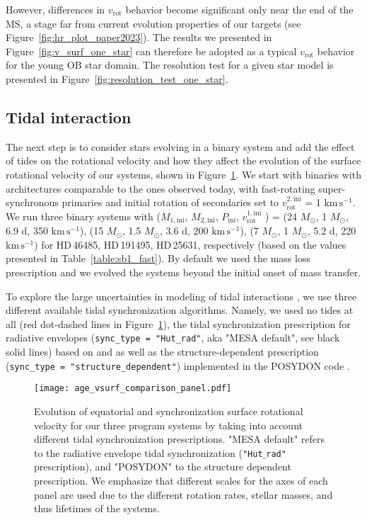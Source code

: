 \documentclass{aa}
\newcommand{\kms}{$\mathrm{km\,s^{-1}}$}
\DeclareRobustCommand{\Figref}[1]{Figure~\ref{#1}}
\DeclareRobustCommand{\Tabref}[1]{Table~\ref{#1}}
\begin{document}
However, differences in $v_\mathrm{rot}$
behavior become significant only near the end of the MS, a stage far from
current evolution properties of our targets (see \Figref{fig:hr_plot_paper2023}). The results we presented in
\Figref{fig:v_surf_one_star} can therefore be adopted as a typical
$v_\mathrm{rot}$ behavior for the young OB star domain. The resolution
test for a given star model is presented in
\Figref{fig:resolution_test_one_star}.



\subsection{Tidal interaction}

The next step is to consider stars evolving in a binary system and add the effect of tides on the rotational velocity
and how they affect the evolution of the surface rotational
  velocity of our systems, shown in \Figref{fig:v_surf}. We
start with binaries with architectures comparable to the ones observed
today, with fast-rotating super-synchronous primaries and initial rotation of secondaries set to $v_\mathrm{rot}^\mathrm{2,ini}$ = 1 \kms.
We run three binary systems with ($M_\mathrm{1,ini}$, $M_\mathrm{2,ini}$,
$P_\mathrm{ini}$, $v_\mathrm{rot}^\mathrm{1,ini}$ ) = (24 $M_{\odot}$, 1 $M_{\odot}$, 6.9 d, 350 \kms), (15 $M_{\odot}$, 1.5 $M_{\odot}$,  3.6 d, 200 \kms), (7 $M_{\odot}$, 1 $M_{\odot}$, 5.2 d, 220 \kms) for HD\,46485, HD\,191495, HD\,25631, respectively (based on the values presented in \Tabref{table:sb1_fast}).
By default we used the \citet{Vink_2001} mass loss prescription and we evolved the systems beyond the initial onset of mass transfer.


To explore the large uncertainties in modeling of tidal interactions
\citep[e.g.,][]{zahn:75, Zahn_1977, Qin_2018, preece:22, fuller:22}, we use three different
available tidal synchronization algorithms. Namely, we used
no tides at all (red dot-dashed lines in \Figref{fig:v_surf}), the tidal synchronization prescription for radiative envelopes
(\texttt{sync\_type = "Hut\_rad"}, aka "MESA default", see black solid lines) based on \citet{Hut_1980} and
\citet{Hurley_2002} as well as the structure-dependent
prescription (\texttt{sync\_type = "structure\_dependent"})
implemented in the POSYDON code \citep[blue dashed lines, based on][]{Qin_2018, Fragos_2023}.

\begin{figure}[!ht]
  \centering
  \texttt{[image: age\_vsurf\_comparison\_panel.pdf]}
  \caption{Evolution of equatorial and synchronization surface rotational velocity for our
    three program systems by taking into account different tidal
    synchronization prescriptions. "MESA default" refers to the
    radiative envelope tidal synchronization (\texttt{"Hut$\_$rad"}
    prescription), and "POSYDON" to the structure dependent
    prescription. We emphasize that different scales for the axes of
      each panel are used due to the different rotation rates, stellar
      masses, and thus lifetimes of the systems.}
  \label{fig:v_surf}
  
\end{figure}
\end{document}
